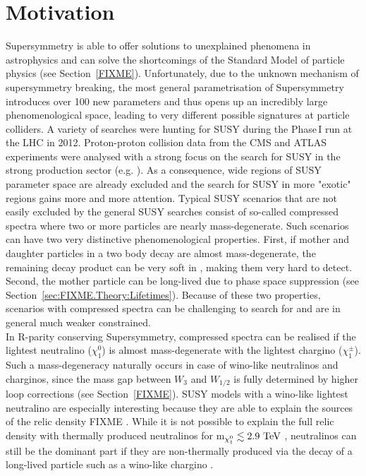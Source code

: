 \chapter{Motivation}
\label{sec:Motivation}
Supersymmetry is able to offer solutions to unexplained phenomena in astrophysics and can solve the shortcomings of the Standard Model of particle physics (see Section~\ref{FIXME}).
Unfortunately, due to the unknown mechanism of supersymmetry breaking, the most general parametrisation of Supersymmetry introduces over 100 new parameters and thus opens up an incredibly large phenomenological space, 
leading to very different possible signatures at particle colliders. 
A variety of searches were hunting for SUSY during the Phase\,I run at the LHC in 2012.
Proton-proton collision data from the CMS and ATLAS experiments were analysed with a strong focus on the search for SUSY in the strong production sector (e.g. \cite{bib:CMS:RA2_8TeV,bib:CMS:MT2_8TeV,bib:ATLAS:JetPlusMET_8TeV}).
As a consequence, wide regions of SUSY parameter space are already excluded and 
the search for SUSY in more "exotic" regions gains more and more attention. 
Typical SUSY scenarios that are not easily excluded by the general SUSY searches consist of so-called compressed spectra where two or more particles are nearly mass-degenerate.
Such scenarios can have two very distinctive phenomenological properties.
First, if mother and daughter particles in a two body decay are almost mass-degenerate, the remaining decay product can be very soft in \pt, making them very hard to detect.
Second, the mother particle can be long-lived due to phase space suppression (see Section~\ref{sec:FIXME.Theory:Lifetimes}).
Because of these two properties, scenarios with compressed spectra can be challenging to search for and are in general much weaker constrained.\\

In R-parity conserving Supersymmetry, compressed spectra can be realised if the lightest neutralino ($\chi^{0}_1$) is almost mass-degenerate with the lightest chargino ($\chi^{\pm}_1$).
Such a mass-degeneracy naturally occurs in case of wino-like neutralinos and charginos, since the mass gap between $W_{3}$ and $W_{1/2}$ is fully determined by higher loop corrections (see Section~\ref{FIXME}).
SUSY models with a wino-like lightest neutralino are especially interesting because they are able to explain the sources of the relic density FIXME \cite{}. 
While it is not possible to explain the full relic density with thermally produced neutralinos for m$_{\chi^{0}_1}\lesssim 2.9\,\,\text{Te}\kern-0.06667em\text{V}$ \cite{bib:Ibe:DarkMatter_2015}, neutralinos can still be the dominant part if they are non-thermally produced via the decay of a long-lived particle such as a wino-like chargino \cite{bib:Moroi:DarkMatter_2013}.\\

